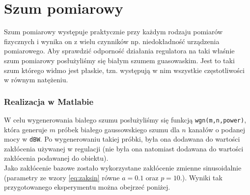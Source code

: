 \chapter{Szum pomiarowy}
Szum pomiarowy występuje praktycznie przy każdym rodzaju pomiarów fizycznych i wynika on z wielu czynników np. niedokładność urządzenia pomiarowego. Aby sprawdzić odporność działania regulatora na taki właśnie szum pomiarowy posłużyliśmy się białym szumem guasowaskim. Jest to taki szum którego widmo jest płaskie, tzn. występują w nim wszystkie częstotliwości w równym natężeniu.
\subsection{Realizacja w Matlabie}
W celu wygenerowania białego szumu posłużyliśmy się funkcją \verb|wgn(m,n,power)|, która generuje $m$ próbek białego gaussowskiego szumu dla $n$ kanałów o podanej mocy w \verb|dBW|. Po wygenerowaniu takiej próbki, była ona dodawana do wartości zakłócenia używanej w regulacji (nie była ona natomiast dodawana do wartości zakłócenia podawanej do obiektu). \\
Jako zakłócenie bazowe zostało wykorzystane zakłócenie zmienne sinusoidalnie (parametry ze wzory \ref{eq:zaksin} równe $a=0.1$ oraz $p=10$.). Wyniki tak przygotowanego eksperymentu można obejrzeć poniżej.
